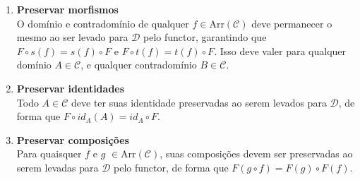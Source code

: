 \documentclass[12pt,a4paper]{article}
\begin{document}
\begin{enumerate}
    \begin{enumerate}
        \begin{enumerate}
            \item \textbf{Preservar morfismos}\\
            
            O domínio e contradomínio de qualquer $f \in \mathrm{Arr(\mathcal{C})}$ deve permanecer o mesmo ao ser levado para $\mathcal{D}$ pelo functor, garantindo que $F \circ s(f) = s(f) \circ F$ e $F \circ t(f) = t(f) \circ F$. Isso deve valer para qualquer domínio $A \in \mathcal{C}$, e qualquer contradomínio $B \in \mathcal{C}$. 
            
            \begin{center}
            \end{center}

            
            \item \textbf{Preservar identidades} \\
            
            Todo $A \in \mathcal{C}$ deve ter suas identidade preservadas ao serem levados para $\mathcal{D}$, de forma que $F \circ id_A (A) = id_A \circ F$.

            \begin{center}
            \end{center}


            \item \textbf{Preservar composições} \\

            Para quaisquer $f$ e $g$ $\in \mathrm{Arr(\mathcal{C})}$, suas composições devem ser preservadas ao serem levadas para $\mathcal{D}$ pelo functor, de forma que $F(g \circ f) = F(g) \circ F(f).$


\end{enumerate}
\end{enumerate}
\end{enumerate}
\end{document}
